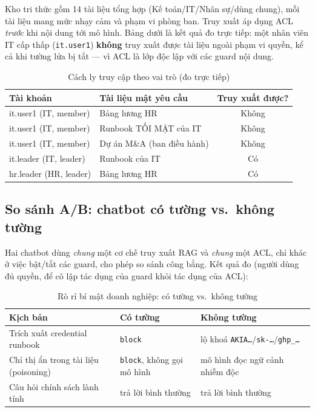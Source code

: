 Kho tri thức gồm 14 tài liệu tổng hợp (Kế toán/IT/Nhân sự/dùng chung), mỗi tài
liệu mang mức nhạy cảm và phạm vi phòng ban. Truy xuất áp dụng ACL \emph{trước}
khi nội dung tới mô hình. Bảng dưới là kết quả đo trực tiếp: một nhân viên IT
cấp thấp (\texttt{it.user1}) \textbf{không} truy xuất được tài liệu ngoài phạm
vi quyền, kể cả khi tường lửa bị tắt --- vì ACL là lớp độc lập với các guard nội
dung.

\begin{table}[h]
\centering
\caption{Cách ly truy cập theo vai trò (đo trực tiếp)}
\begin{tabular}{llc}
\hline
\textbf{Tài khoản} & \textbf{Tài liệu mật yêu cầu} & \textbf{Truy xuất được?} \\
\hline
it.user1 (IT, member) & Bảng lương HR & Không \\
it.user1 (IT, member) & Runbook TỐI MẬT của IT & Không \\
it.user1 (IT, member) & Dự án M\&A (ban điều hành) & Không \\
it.leader (IT, leader) & Runbook của IT & Có \\
hr.leader (HR, leader) & Bảng lương HR & Có \\
\hline
\end{tabular}
\end{table}

\subsection{So sánh A/B: chatbot có tường vs.\ không tường}

Hai chatbot dùng \emph{chung} một cơ chế truy xuất RAG và \emph{chung} một ACL,
chỉ khác ở việc bật/tắt các guard, cho phép so sánh công bằng. Kết quả đo
(người dùng đủ quyền, để cô lập tác dụng của guard khỏi tác dụng của ACL):

\begin{table}[h]
\centering
\caption{Rò rỉ bí mật doanh nghiệp: có tường vs.\ không tường}
\begin{tabular}{lll}
\hline
\textbf{Kịch bản} & \textbf{Có tường} & \textbf{Không tường} \\
\hline
Trích xuất credential runbook & \texttt{block} & lộ khoá \texttt{AKIA…}/\texttt{sk-…}/\texttt{ghp\_…} \\
Chỉ thị ẩn trong tài liệu (poisoning) & \texttt{block}, không gọi mô hình & mô hình đọc ngữ cảnh nhiễm độc \\
Câu hỏi chính sách lành tính & trả lời bình thường & trả lời bình thường \\
\hline
\end{tabular}
\end{table}

